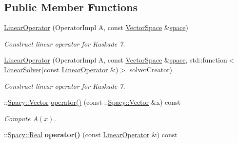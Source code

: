 \subsection*{Public Member Functions}
\begin{DoxyCompactItemize}
\item 
\hyperlink{classSpacy_1_1Kaskade_1_1LinearOperator_a24acb8f5c16194484d4afe5777a5aea5}{Linear\-Operator} (Operator\-Impl A, const \hyperlink{classSpacy_1_1VectorSpace}{Vector\-Space} \&\hyperlink{classSpacy_1_1VectorBase_aa999dbf9d679d895dfe04c10fbf9f5e9}{space})
\begin{DoxyCompactList}\small\item\em Construct linear operator for Kaskade 7. \end{DoxyCompactList}\item 
\hyperlink{classSpacy_1_1Kaskade_1_1LinearOperator_a5c287f9cae480a07428e49af70875b7a}{Linear\-Operator} (Operator\-Impl A, const \hyperlink{classSpacy_1_1VectorSpace}{Vector\-Space} \&\hyperlink{classSpacy_1_1VectorBase_aa999dbf9d679d895dfe04c10fbf9f5e9}{space}, std\-::function$<$ \hyperlink{namespaceSpacy_adcd0d78166a9c972b8a2e5a689fc2d03}{Linear\-Solver}(const \hyperlink{classSpacy_1_1Kaskade_1_1LinearOperator}{Linear\-Operator} \&)$>$ solver\-Creator)
\begin{DoxyCompactList}\small\item\em Construct linear operator for Kaskade 7. \end{DoxyCompactList}\item 
\hypertarget{classSpacy_1_1Kaskade_1_1LinearOperator_added0f85104ded29f4c87992f5b5a81b}{\-::\hyperlink{classSpacy_1_1Vector}{Spacy\-::\-Vector} \hyperlink{classSpacy_1_1Kaskade_1_1LinearOperator_added0f85104ded29f4c87992f5b5a81b}{operator()} (const \-::\hyperlink{classSpacy_1_1Vector}{Spacy\-::\-Vector} \&x) const }\label{classSpacy_1_1Kaskade_1_1LinearOperator_added0f85104ded29f4c87992f5b5a81b}

\begin{DoxyCompactList}\small\item\em Compute $A(x)$. \end{DoxyCompactList}\item 
\hypertarget{classSpacy_1_1Kaskade_1_1LinearOperator_af787d5f0a939baeaca4732fcbb7698ad}{\-::\hyperlink{classSpacy_1_1Real}{Spacy\-::\-Real} {\bfseries operator()} (const \hyperlink{classSpacy_1_1Kaskade_1_1LinearOperator}{Linear\-Operator} \&) const }\label{classSpacy_1_1Kaskade_1_1LinearOperator_af787d5f0a939baeaca4732fcbb7698ad}


\end{DoxyCompactItemize}
